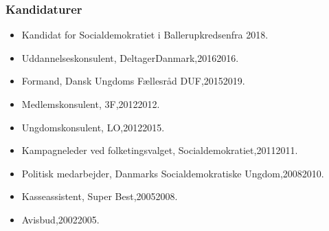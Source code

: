 \documentclass[11pt, a4paper]{awesome-cv}
\begin{document}
\begin{cvletter}
\subsubsection*{Kandidaturer}
\begin{itemize}
\item Kandidat for Socialdemokratiet i Ballerupkredsenfra 2018.
\end{itemize}
\begin{itemize}
\item Uddannelseskonsulent, DeltagerDanmark,20162016.
\item Formand, Dansk Ungdoms Fællesråd DUF,20152019.
\item Medlemskonsulent, 3F,20122012.
\item Ungdomskonsulent, LO,20122015.
\item Kampagneleder ved folketingsvalget, Socialdemokratiet,20112011.
\item Politisk medarbejder, Danmarks Socialdemokratiske Ungdom,20082010.
\item Kasseassistent, Super Best,20052008.
\item Avisbud,20022005.
\end{itemize}
\end{cvletter}
\end{document}
